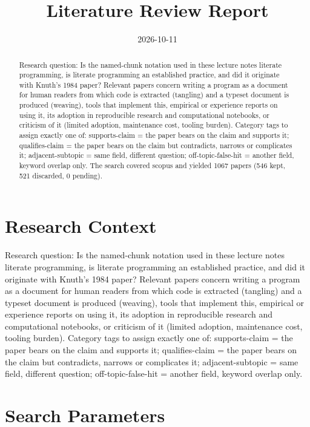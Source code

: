 \documentclass{article}
\title{Literature Review Report}
\date{2026-10-11}
\begin{document}
\maketitle

\begin{abstract}
Research question: Is the named-chunk notation used in these lecture notes literate programming, is literate programming an established practice, and did it originate with Knuth's 1984 paper? Relevant papers concern writing a program as a document for human readers from which code is extracted (tangling) and a typeset document is produced (weaving), tools that implement this, empirical or experience reports on using it, its adoption in reproducible research and computational notebooks, or criticism of it (limited adoption, maintenance cost, tooling burden). Category tags to assign exactly one of: supports-claim = the paper bears on the claim and supports it; qualifies-claim = the paper bears on the claim but contradicts, narrows or complicates it; adjacent-subtopic = same field, different question; off-topic-false-hit = another field, keyword overlap only. The search covered scopus and yielded 1067 papers (546 kept, 521 discarded, 0 pending).
\end{abstract}
\clearpage
\clearpage
\tableofcontents
\clearpage

\section{Research Context}
Research question: Is the named-chunk notation used in these lecture
notes literate programming, is literate programming an established
practice, and did it originate with Knuth's 1984 paper? Relevant papers
concern writing a program as a document for human readers from which
code is extracted (tangling) and a typeset document is produced
(weaving), tools that implement this, empirical or experience reports on
using it, its adoption in reproducible research and computational
notebooks, or criticism of it (limited adoption, maintenance cost,
tooling burden). Category tags to assign exactly one of: supports-claim
= the paper bears on the claim and supports it; qualifies-claim = the
paper bears on the claim but contradicts, narrows or complicates it;
adjacent-subtopic = same field, different question; off-topic-false-hit
= another field, keyword overlap only.

\section{Search Parameters}
\end{document}
